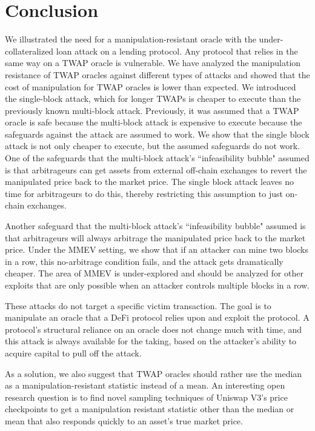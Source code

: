 \documentclass[conference]{IEEEtran}
\begin{document}
\section{Conclusion}
We illustrated the need for a manipulation-resistant oracle with the under-collateralized loan attack on a lending protocol. Any protocol that relies in the same way on a TWAP oracle is vulnerable. We have analyzed the manipulation resistance of TWAP oracles against different types of attacks and showed that the cost of manipulation for TWAP oracles is lower than expected. We introduced the single-block attack, which for longer TWAPs is cheaper to execute than the previously known multi-block attack. Previously, it was assumed that a TWAP oracle is safe because the multi-block attack is expensive to execute because the safeguards against the attack are assumed to work. We show that the single block attack is not only cheaper to execute, but the assumed safeguards do not work. One of the safeguards that the multi-block attack's ``infeasibility bubble" assumed is that arbitrageurs can get assets from external off-chain exchanges to revert the manipulated price back to the market price. The single block attack leaves no time for arbitrageurs to do this, thereby restricting this assumption to just on-chain exchanges.

Another safeguard that the multi-block attack's ``infeasibility bubble" assumed is that arbitrageurs will always arbitrage the manipulated price back to the market price. Under the MMEV setting, we show that if an attacker can mine two blocks in a row, this no-arbitrage condition fails, and the attack gets dramatically cheaper. The area of MMEV is under-explored and should be analyzed for other exploits that are only possible when an attacker controls multiple blocks in a row. 

These attacks do not target a specific victim transaction. The goal is to manipulate an oracle that a DeFi protocol relies upon and exploit the protocol. A protocol's structural reliance on an oracle does not change much with time, and this attack is always available for the taking, based on the attacker's ability to acquire capital to pull off the attack.

As a solution, we also suggest that TWAP oracles should rather use the median as a manipulation-resistant statistic instead of a mean. An interesting open research question is to find novel sampling techniques of Uniswap V3's price checkpoints to get a manipulation resistant statistic other than the median or mean that also responds quickly to an asset's true market price.



\end{document}
